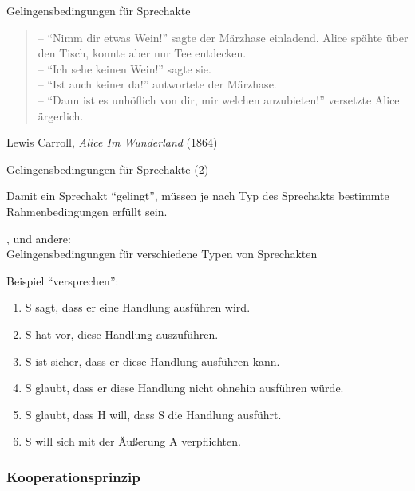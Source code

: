 \begin{frame}{Gelingensbedingungen für Sprechakte}
 \begin{quote} 
-- "`Nimm dir etwas Wein!"' sagte der Märzhase einladend. Alice spähte über den Tisch, konnte aber nur Tee entdecken.\\
-- "`Ich sehe keinen Wein!"' sagte sie.\\
-- "`Ist auch keiner da!"' antwortete der Märzhase.\\
-- "`Dann ist es unhöflich von dir, mir welchen anzubieten!"' versetzte Alice ärgerlich.\\
\end{quote}

{\small Lewis Carroll, \textit{Alice Im Wunderland} (1864)}
\end{frame}



\begin{frame}{Gelingensbedingungen  für Sprechakte (2)}

Damit ein Sprechakt "`gelingt"', müssen je nach Typ des Sprechakts bestimmte Rahmenbedingungen
erfüllt sein. 

\cite{Austin1962}, \cite{Searle1969,Searle1979} und andere:\\
Gelingensbedingungen für verschiedene Typen von Sprechakten

Beispiel "`versprechen"':

\begin{enumerate}[<+->]
\item S sagt, dass er eine Handlung ausführen wird.
\item S hat vor, diese Handlung auszuführen.
\item S ist sicher, dass er diese Handlung ausführen kann.
\item S glaubt, dass er diese Handlung nicht ohnehin ausführen würde.
\item S glaubt, dass H will, dass S die Handlung ausführt.
\item S will sich mit der Äußerung A verpflichten. 
\end{enumerate}
\end{frame}



\subsubsection{Kooperationsprinzip}




